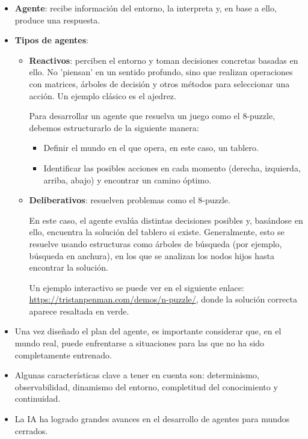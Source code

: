 

\begin{itemize}
    \item \textbf{Agente}: recibe información del entorno, la interpreta y, en base a ello, produce una respuesta.
    \item \textbf{Tipos de agentes}:
    \begin{itemize}
        \item \textbf{Reactivos}: perciben el entorno y toman decisiones concretas basadas en ello. No 'piensan' en un sentido profundo, sino que realizan operaciones con matrices, árboles de decisión y otros métodos para seleccionar una acción. Un ejemplo clásico es el ajedrez.

        Para desarrollar un agente que resuelva un juego como el 8-puzzle, debemos estructurarlo de la siguiente manera:
        \begin{itemize}
            \item Definir el mundo en el que opera, en este caso, un tablero.
            \item Identificar las posibles acciones en cada momento (derecha, izquierda, arriba, abajo) y encontrar un camino óptimo.
        \end{itemize}

        \item \textbf{Deliberativos}: resuelven problemas como el 8-puzzle.  
        
        En este caso, el agente evalúa distintas decisiones posibles y, basándose en ello, encuentra la solución del tablero si existe.  
        Generalmente, esto se resuelve usando estructuras como árboles de búsqueda (por ejemplo, búsqueda en anchura), en los que se analizan los nodos hijos hasta encontrar la solución.  

        Un ejemplo interactivo se puede ver en el siguiente enlace:  
        \url{https://tristanpenman.com/demos/n-puzzle/}, donde la solución correcta aparece resaltada en verde.
    \end{itemize}
    
    \item Una vez diseñado el plan del agente, es importante considerar que, en el mundo real, puede enfrentarse a situaciones para las que no ha sido completamente entrenado.
    \item Algunas características clave a tener en cuenta son: determinismo, observabilidad, dinamismo del entorno, completitud del conocimiento y continuidad.
    \item La IA ha logrado grandes avances en el desarrollo de agentes para mundos cerrados.
\end{itemize}


